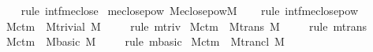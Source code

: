 \begin{isabellebody}
%
\isadelimproof
\ \ %
\endisadelimproof
%
\isatagproof
{}\isamarkupfalse%
\ {\isacharparenleft}{\kern0pt}rule\ intf{\isachardot}{\kern0pt}meclose{\isacharparenright}{\kern0pt}%
\endisatagproof
{\isafoldproof}%
%
\isadelimproof
\isanewline
%
\endisadelimproof
\isanewline
{}\isamarkupfalse%
\ meclose{\isacharunderscore}{\kern0pt}pow{\isacharcolon}{\kern0pt}\ {\isachardoublequoteopen}M{\isacharunderscore}{\kern0pt}eclose{\isacharunderscore}{\kern0pt}pow{\isacharparenleft}{\kern0pt}{\isacharhash}{\kern0pt}{\isacharhash}{\kern0pt}M{\isacharparenright}{\kern0pt}{\isachardoublequoteclose}\isanewline
%
\isadelimproof
\ \ %
\endisadelimproof
%
\isatagproof
{}\isamarkupfalse%
\ {\isacharparenleft}{\kern0pt}rule\ intf{\isachardot}{\kern0pt}meclose{\isacharunderscore}{\kern0pt}pow{\isacharparenright}{\kern0pt}%
\endisatagproof
{\isafoldproof}%
%
\isadelimproof
\isanewline
%
\endisadelimproof
\isanewline
\isanewline
\isanewline
{}\isamarkupfalse%
\ \isanewline
\isanewline
\isanewline
{}\isamarkupfalse%
\ M{\isacharunderscore}{\kern0pt}ctm\ {\isasymsubseteq}\ M{\isacharunderscore}{\kern0pt}trivial\ {\isachardoublequoteopen}{\isacharhash}{\kern0pt}{\isacharhash}{\kern0pt}M{\isachardoublequoteclose}\isanewline
%
\isadelimproof
\ \ %
\endisadelimproof
%
\isatagproof
{}\isamarkupfalse%
\ \ {\isacharparenleft}{\kern0pt}rule\ mtriv{\isacharparenright}{\kern0pt}%
\endisatagproof
{\isafoldproof}%
%
\isadelimproof
\isanewline
%
\endisadelimproof
\isanewline
{}\isamarkupfalse%
\ M{\isacharunderscore}{\kern0pt}ctm\ {\isasymsubseteq}\ M{\isacharunderscore}{\kern0pt}trans\ {\isachardoublequoteopen}{\isacharhash}{\kern0pt}{\isacharhash}{\kern0pt}M{\isachardoublequoteclose}\isanewline
%
\isadelimproof
\ \ %
\endisadelimproof
%
\isatagproof
{}\isamarkupfalse%
\ \ {\isacharparenleft}{\kern0pt}rule\ mtrans{\isacharparenright}{\kern0pt}%
\endisatagproof
{\isafoldproof}%
%
\isadelimproof
\isanewline
%
\endisadelimproof
\isanewline
{}\isamarkupfalse%
\ M{\isacharunderscore}{\kern0pt}ctm\ {\isasymsubseteq}\ M{\isacharunderscore}{\kern0pt}basic\ {\isachardoublequoteopen}{\isacharhash}{\kern0pt}{\isacharhash}{\kern0pt}M{\isachardoublequoteclose}\isanewline
%
\isadelimproof
\ \ %
\endisadelimproof
%
\isatagproof
{}\isamarkupfalse%
\ \ {\isacharparenleft}{\kern0pt}rule\ mbasic{\isacharparenright}{\kern0pt}%
\endisatagproof
{\isafoldproof}%
%
\isadelimproof
\isanewline
%
\endisadelimproof
\isanewline
{}\isamarkupfalse%
\ M{\isacharunderscore}{\kern0pt}ctm\ {\isasymsubseteq}\ M{\isacharunderscore}{\kern0pt}trancl\ {\isachardoublequoteopen}{\isacharhash}{\kern0pt}{\isacharhash}{\kern0pt}M{\isachardoublequoteclose}\isanewline

\end{isabellebody}

